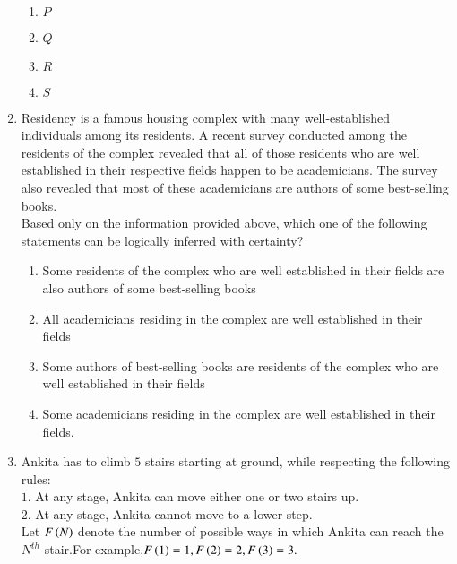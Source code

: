 \documentclass[journal]{IEEEtran}
\begin{document}
\begin{enumerate}
\\
    \begin{enumerate}
        \item $P$
        \item $Q$
        \item $R$
        \item $S$
    \end{enumerate}
    \item Residency is a famous housing complex with many well-established individuals among its residents. A recent survey conducted among the residents of the complex revealed that all of those residents who are well established in their respective fields happen to be academicians. The survey also revealed that most of these academicians are authors of some best-selling books.\\
    Based only on the information provided above, which one of the following statements can be logically inferred with certainty?
    \begin{enumerate}
        \item Some residents of the complex who are well established in their fields are also authors of some best-selling books
        \item All academicians residing in the complex are well established in their fields
        \item Some authors of best-selling books are residents of the complex who are well established in their fields
        \item Some academicians residing in the complex are well established in their fields.
    \end{enumerate}
    \item Ankita has to climb $5$ stairs starting at ground, while respecting the following rules:\\
    $1.$ At any stage, Ankita can move either one or two stairs up.\\
    $2.$ At any stage, Ankita cannot move to a lower step.\\
    Let $F\left(N\right)$ denote the number of possible ways in which Ankita can reach the $N^{th}$ stair.For example,$F\left(1\right)=1,F\left(2\right)=2,F\left(3\right)=3.$\\

\end{enumerate}
\end{document}

